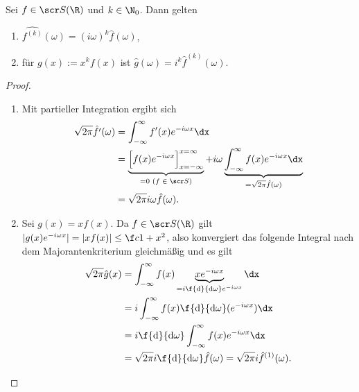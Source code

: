 \begin{st} \label{4.7}
	Sei $f \in \scr S(\R)$ und $k \in \N_0$.
	Dann gelten
	\begin{enumerate}[1)]
		\item
			$\widehat {f^{(k)}}(\omega) = (i \omega)^k \hat f(\omega)$,
		\item
			für $g(x) := x^k f(x)$ ist $\hat g(\omega) = i^k \hat f^{(k)} (\omega)$.
	\end{enumerate}
	\begin{proof}
		\begin{enumerate}[1)]
			\item
				Mit partieller Integration ergibt sich
				\begin{align*}
					\sqrt {2\pi} \hat{f'}(\omega)
					&= \int_{-\infty}^\infty f'(x) e^{-i\omega x} \dx \\
					&= \underbrace{\Big[f(x) e^{-i\omega x}  \Big]_{x=-\infty}^{x=\infty}}_{=0 \text{ ($f \in \scr S$)}} + i\omega \underbrace{\int_{-\infty}^\infty f(x) e^{-i\omega x} \dx}_{= \sqrt{2\pi} \hat f(\omega)} \\
					&= \sqrt{2\pi} i \omega \hat f(\omega).
				\end{align*}
			\item
				Sei $g(x) = x f(x)$.
				Da $f \in \scr S(\R)$ gilt $|g(x) e^{-i\omega x}| = |xf(x)| \le \f c{1+x^2}$, also konvergiert das folgende Integral nach dem Majorantenkriterium gleichmäßig und es gilt
				\begin{align*}
					\sqrt{2\pi} \hat g(x)
					&= \int_{-\infty}^\infty f(x) \underbrace{ xe^{-i \omega x}}_{= i \f{\mathrm d}{\mathrm d \omega} e^{-i \omega x}} \dx \\
					&= i \int_{-\infty}^\infty f(x) \f {\mathrm d}{\mathrm d \omega} (e^{-i \omega x}) \dx \\
					&= i \f {\mathrm d}{\mathrm d \omega} \int_{-\infty}^\infty f(x) e^{-i \omega x} \dx \\
					&=\sqrt{2\pi} i \f {\mathrm d}{\mathrm d \omega} \hat f(\omega)
					= \sqrt{2\pi} i {\hat f}^{(1)} (\omega).
				\end{align*}
		\end{enumerate}
	\end{proof}
\end{st}

